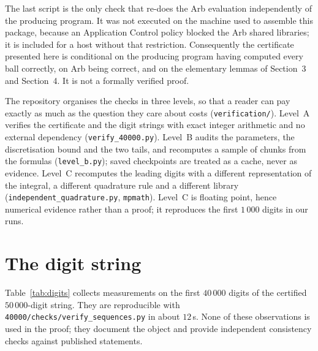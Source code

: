 \documentclass[11pt,a4paper]{article}
\theoremstyle{remark}
\begin{document}
The last script is the only check that re-does the Arb evaluation
independently of the producing program. It was not executed on the
machine used to assemble this package, because an Application Control
policy blocked the Arb shared libraries; it is included for a host
without that restriction. Consequently the certificate presented here is
conditional on the producing program having computed every ball
correctly, on Arb being correct, and on the elementary lemmas of
Section~3 and Section~4. It is not a formally verified proof.

The repository organises the checks in three levels, so that a reader can
pay exactly as much as the question they care about costs
(\texttt{verification/}). Level~A verifies the certificate and the digit
strings with exact integer arithmetic and no external dependency
(\texttt{verify\_40000.py}). Level~B audits the parameters, the
discretisation bound and the two tails, and recomputes a sample of chunks
from the formulas (\texttt{level\_b.py}); saved checkpoints are treated as a
cache, never as evidence. Level~C recomputes the leading digits with a
different representation of the integral, a different quadrature rule and a
different library (\texttt{independent\_quadrature.py}, \texttt{mpmath}).
Level~C is floating point, hence numerical evidence rather than a proof; it
reproduces the first $1\,000$ digits in our runs.

\section{The digit string}

Table~\ref{tab:digits} collects measurements on the first $40\,000$
digits of the certified $50\,000$-digit string. They are reproducible
with \texttt{40000/checks/verify\_sequences.py} in about $12$\,s. None of
these observations is used in the proof; they document the object and
provide independent consistency checks against published statements.
\end{document}
